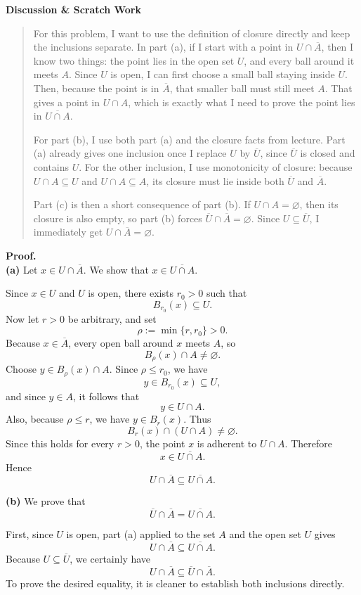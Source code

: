 \documentclass[12pt]{article}
\newenvironment{scratch}{%
  \par\smallskip
  \noindent\textbf{Discussion \& Scratch Work}\begin{quote}\small
}{%
  \end{quote}\smallskip
}
\begin{document}
\begin{scratch}
For this problem, I want to use the definition of closure directly and keep the inclusions separate. In part (a), if I start with a point in $U\cap\overline{A}$, then I know two things: the point lies in the open set $U$, and every ball around it meets $A$. Since $U$ is open, I can first choose a small ball staying inside $U$. Then, because the point is in $\overline{A}$, that smaller ball must still meet $A$. That gives a point in $U\cap A$, which is exactly what I need to prove the point lies in $\overline{U\cap A}$.

For part (b), I use both part (a) and the closure facts from lecture. Part (a) already gives one inclusion once I replace $U$ by $\overline{U}$, since $\overline{U}$ is closed and contains $U$. For the other inclusion, I use monotonicity of closure: because $U\cap A\subseteq U$ and $U\cap A\subseteq A$, its closure must lie inside both $\overline{U}$ and $\overline{A}$.

Part (c) is then a short consequence of part (b). If $U\cap A=\varnothing$, then its closure is also empty, so part (b) forces $\overline{U}\cap\overline{A}=\varnothing$. Since $U\subseteq\overline{U}$, I immediately get $U\cap\overline{A}=\varnothing$.
\end{scratch}

\textbf{Proof.}\\
\textbf{(a)} Let $x\in U\cap\overline{A}$. We show that $x\in \overline{U\cap A}$.

Since $x\in U$ and $U$ is open, there exists $r_0>0$ such that
\[
B_{r_0}(x)\subseteq U.
\]
Now let $r>0$ be arbitrary, and set
\[
\rho:=\min\{r,r_0\}>0.
\]
Because $x\in\overline{A}$, every open ball around $x$ meets $A$, so
\[
B_{\rho}(x)\cap A\neq\varnothing.
\]
Choose $y\in B_{\rho}(x)\cap A$. Since $\rho\le r_0$, we have
\[
y\in B_{r_0}(x)\subseteq U,
\]
and since $y\in A$, it follows that
\[
y\in U\cap A.
\]
Also, because $\rho\le r$, we have $y\in B_r(x)$. Thus
\[
B_r(x)\cap (U\cap A)\neq\varnothing.
\]
Since this holds for every $r>0$, the point $x$ is adherent to $U\cap A$. Therefore
\[
x\in\overline{U\cap A}.
\]
Hence
\[
U\cap\overline{A}\subseteq \overline{U\cap A}.
\]

\textbf{(b)} We prove that
\[
\overline{U}\cap\overline{A}=\overline{U\cap A}.
\]

First, since $U$ is open, part (a) applied to the set $A$ and the open set $U$ gives
\[
U\cap\overline{A}\subseteq \overline{U\cap A}.
\]
Because $U\subseteq \overline{U}$, we certainly have
\[
U\cap\overline{A}\subseteq \overline{U}\cap\overline{A}.
\]
To prove the desired equality, it is cleaner to establish both inclusions directly.
\end{document}
